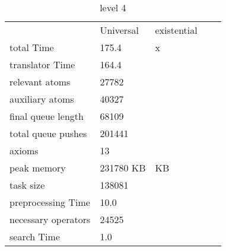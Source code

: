 			
			\begin{table}[h]
				\centering
				\caption{level 4}
				\label{lvl4}
				\begin{tabular}{lllll}
					& Universal & existential  \\
					total Time& 175.4 & x \\
					translator Time& 164.4 &  \\
					
					
					relevant atoms & 27782 & \\
					auxiliary atoms & 40327 & \\
					final queue length & 68109 & \\
					total queue pushes & 201441 & \\
					axioms & 13 &  \\ 
					peak memory & 231780 KB &  KB\\ 
					task size & 138081 & \\
					
					preprocessing Time& 10.0 &  \\
					necessary operators & 24525 & \\
					
					search Time & 1.0 &  \\
				\end{tabular}
			\end{table}
			
